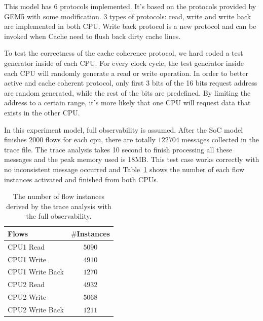 \documentclass[12pt,frontmatter,copyright,thesis]{usfmanus}
\begin{document}
This model has 6 protocols implemented. It's based on the protocols provided by GEM5 with some modification. 3 types of protocols: read, write and write back are implemented in both CPU. Write back protocol is a new protocol
and can be invoked when Cache need to flush back dirty cache lines.

To test the correctness of the cache coherence protocol, we hard coded a test generator inside
of each CPU. 
For every clock cycle, the test generator inside each CPU will randomly generate a read or write operation. In order to better active and cache coherent protocol, only first 3 bits of the 16 bits request address are random generated, while the rest of the bits are predefined. By limiting the address to a certain range, it's more likely that one CPU will request data that exists in the other CPU.

In this experiment model, full observability is assumed.
After the SoC model finishes 2000 flows for each cpu, there
are totally $122704$ messages collected in the trace file.
The trace analysis takes 10 second to finish processing
all these messages and the peak memory used is 18MB.
This test case works correctly with no inconsistent message occurred 
and
Table~\ref{table-case-3} shows the number of each flow instances activated and
finished from both CPUs.
\begin{table}[h]
\caption{The number of flow instances derived by the trace analysis with the full observability.}
\begin{center}
\begin{tabular}{|l|c|}
\hline
Flows & $\#$Instances \\
\hline
\hline
CPU1 Read			&  $5090$\\
CPU1 Write				&  $4910$\\
CPU1 Write Back				&  $1270$\\

\hline
CPU2 Read			&  $4932$\\
CPU2 Write				&  $5068$\\
CPU2 Write Back				&  $1211$\\
\hline
\end{tabular}
\end{center}
\label{table-case-3}
\end{table}%
\end{document}
